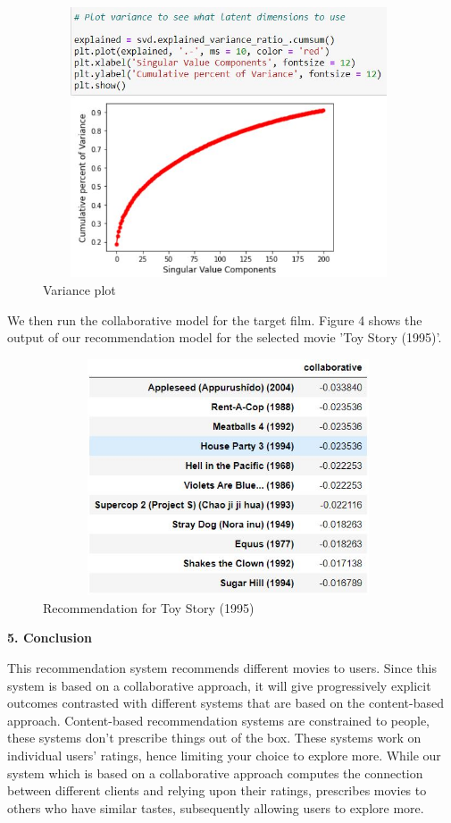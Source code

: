 \documentclass{article}
\begin{document}
\begin{figure}[htp]
    \centering
    \Large\includegraphics[width=11cm, height=8cm]{VariancePlot.JPG}
    \caption{Variance plot}
    \label{fig:VariancePlot}
\end{figure}

\begin{flushleft}
We then run the collaborative model for the target film. Figure 4 shows the output of our recommendation model for the selected movie 'Toy Story (1995)'.
\end{flushleft}

\begin{figure}[htp]
    \centering
    \Large\includegraphics[width=11cm, height=7cm]{Recommend.JPG}
    \caption{Recommendation for Toy Story (1995)}
    \label{fig:Recommend}
\end{figure}


\begin{flushleft}
\textbf{\large 5. Conclusion}
\end{flushleft}

This recommendation system recommends different movies to users. Since this system is based on a collaborative approach, it will give progressively explicit outcomes contrasted with different systems that are based on the content-based approach. Content-based recommendation systems are constrained to people, these systems don't prescribe things out of the box. These systems work on individual users’ ratings, hence limiting your choice to explore more. While our system which is based on a collaborative approach computes the connection between different clients and relying upon their ratings, prescribes movies to others who have similar tastes, subsequently allowing users to explore more.\\
\end{document}
